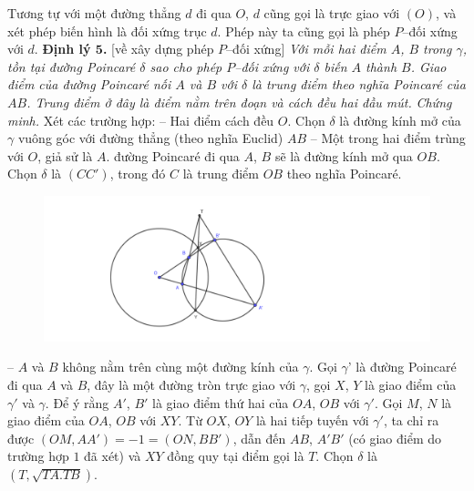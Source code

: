 \begin{multicols}{2}
{	Tương tự với một đường thẳng $d$ đi qua $O$, $d$ cũng gọi là trực giao với $(O)$, và xét phép biến hình là đối xứng trục $d$. Phép này ta cũng gọi là phép $P$--đối xứng với $d$.}
	\vskip 0.1cm
	\textbf{\color{lichsutoanhoc}Định lý $\pmb{5}$.} [về xây dựng phép $P$--đối xứng]  \textit{Với mỗi hai điểm $A$, $B$ trong $\gamma$, tồn tại đường Poincar\'e $\delta$ sao cho phép $P$--đối xứng với $\delta$ biến $A$ thành $B$. Giao điểm của đường Poincar\'e nối $A$ và $B$ với $\delta$ là trung điểm theo nghĩa Poincar\'e của $AB$. Trung điểm ở đây là điểm nằm trên đoạn và cách đều hai đầu mút.}
	\vskip 0.1cm
	\textit{Chứng minh.} Xét các trường hợp:
	\vskip 0.1cm
	-- Hai điểm cách đều $O$. Chọn $\delta$ là đường kính mở của $\gamma$ vuông góc với đường thẳng (theo nghĩa Euclid) $AB$ 
	\vskip 0.1cm
	-- Một trong hai điểm trùng với $O$, giả sử là $A$. đường Poincar\'e đi qua $A$, $B$ sẽ là đường kính mở qua $OB$. Chọn $\delta$ là $(CC')$, trong đó $C$ là trung điểm $OB$ theo nghĩa Poincar\'e.
	\begin{figure}[H]
		\vspace*{-5pt}
		\centering
		\captionsetup{labelformat= empty, justification=centering}
		\includegraphics[width= 1\linewidth]{TH_3_dinh_ly_xay_dung.pdf}
		\vspace*{-15pt}
	\end{figure}
	-- $A$ và $B$ không nằm trên cùng một đường kính của $\gamma$. Gọi $\gamma$' là đường Poincar\'e đi qua $A$ và $B$, đây là một đường tròn trực giao với $\gamma$, gọi $X$, $Y$ là giao điểm của $\gamma'$ và $\gamma$. Để ý rằng $A'$, $B'$ là giao điểm thứ hai của $OA$, $OB$ với $\gamma'$. Gọi $M$, $N$ là giao điểm của $OA$, $OB$ với $XY$. Từ $OX$, $OY$ là hai tiếp tuyến với $\gamma'$, ta chỉ ra được $(OM, AA') = -1 = (ON, BB')$, dẫn đến $AB$, $A'B'$ (có giao điểm do trường hợp $1$ đã xét) và $XY$ đồng quy tại điểm gọi là $T$. Chọn $\delta$ là $(T, \sqrt{TA.TB})$.
	\begin{figure}[H]
		\vspace*{-5pt}
		\centering

\end{figure}
\end{multicols}
